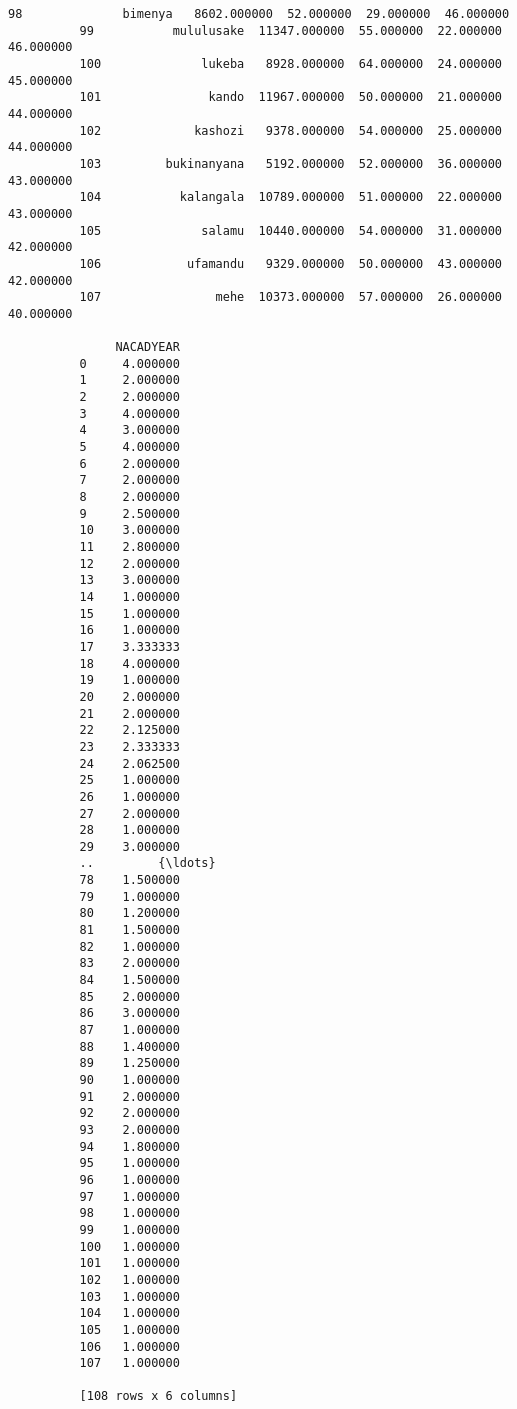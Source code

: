 \documentclass[11pt]{article}
\begin{document}
\begin{Verbatim}[commandchars=\\\{\}]
          98              bimenya   8602.000000  52.000000  29.000000  46.000000   
          99           mululusake  11347.000000  55.000000  22.000000  46.000000   
          100              lukeba   8928.000000  64.000000  24.000000  45.000000   
          101               kando  11967.000000  50.000000  21.000000  44.000000   
          102             kashozi   9378.000000  54.000000  25.000000  44.000000   
          103         bukinanyana   5192.000000  52.000000  36.000000  43.000000   
          104           kalangala  10789.000000  51.000000  22.000000  43.000000   
          105              salamu  10440.000000  54.000000  31.000000  42.000000   
          106            ufamandu   9329.000000  50.000000  43.000000  42.000000   
          107                mehe  10373.000000  57.000000  26.000000  40.000000   
          
               NACADYEAR  
          0     4.000000  
          1     2.000000  
          2     2.000000  
          3     4.000000  
          4     3.000000  
          5     4.000000  
          6     2.000000  
          7     2.000000  
          8     2.000000  
          9     2.500000  
          10    3.000000  
          11    2.800000  
          12    2.000000  
          13    3.000000  
          14    1.000000  
          15    1.000000  
          16    1.000000  
          17    3.333333  
          18    4.000000  
          19    1.000000  
          20    2.000000  
          21    2.000000  
          22    2.125000  
          23    2.333333  
          24    2.062500  
          25    1.000000  
          26    1.000000  
          27    2.000000  
          28    1.000000  
          29    3.000000  
          ..         {\ldots}  
          78    1.500000  
          79    1.000000  
          80    1.200000  
          81    1.500000  
          82    1.000000  
          83    2.000000  
          84    1.500000  
          85    2.000000  
          86    3.000000  
          87    1.000000  
          88    1.400000  
          89    1.250000  
          90    1.000000  
          91    2.000000  
          92    2.000000  
          93    2.000000  
          94    1.800000  
          95    1.000000  
          96    1.000000  
          97    1.000000  
          98    1.000000  
          99    1.000000  
          100   1.000000  
          101   1.000000  
          102   1.000000  
          103   1.000000  
          104   1.000000  
          105   1.000000  
          106   1.000000  
          107   1.000000  
          
          [108 rows x 6 columns]
\end{Verbatim}
        
\end{document}
